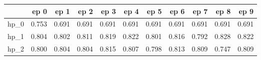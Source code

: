 \begin{tabular}{lrrrrrrrrrr}
\toprule
{} &   ep 0 &   ep 1 &   ep 2 &   ep 3 &   ep 4 &   ep 5 &   ep 6 &   ep 7 &   ep 8 &   ep 9 \\
\midrule
hp\_0 &  0.753 &  0.691 &  0.691 &  0.691 &  0.691 &  0.691 &  0.691 &  0.691 &  0.691 &  0.691 \\
hp\_1 &  0.804 &  0.802 &  0.811 &  0.819 &  0.822 &  0.801 &  0.816 &  0.792 &  0.828 &  0.822 \\
hp\_2 &  0.800 &  0.804 &  0.804 &  0.815 &  0.807 &  0.798 &  0.813 &  0.809 &  0.747 &  0.809 \\
\bottomrule
\end{tabular}
